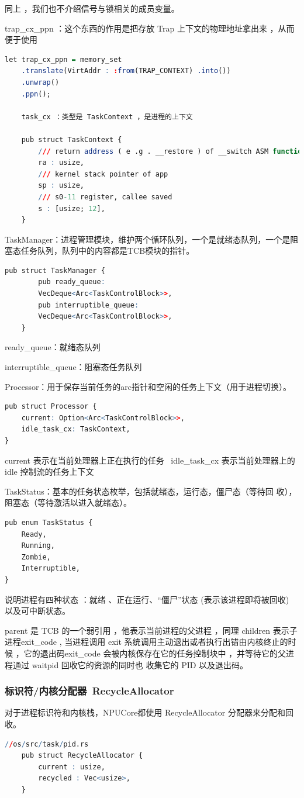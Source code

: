 同上 ，我们也不介绍信号与锁相关的成员变量。

trap\_cx\_ppn ：这个东西的作用是把存放 Trap 上下文的物理地址拿出来 ，从而便于使用

\begin{lstlisting}[language=R]
	let trap_cx_ppn = memory_set
	.translate(VirtAddr : :from(TRAP_CONTEXT) .into())
	.unwrap()
	.ppn();
	
	task_cx ：类型是 TaskContext ，是进程的上下文
	
	pub struct TaskContext {
		/// return address ( e .g . __restore ) of __switch ASM function
		ra : usize,
		/// kernel stack pointer of app
		sp : usize,
		/// s0-11 register, callee saved
		s : [usize; 12],
	}
\end{lstlisting}

TaskManager：进程管理模块，维护两个循环队列，一个是就绪态队列，一个是阻塞态任务队列，队列中的内容都是TCB模块的指针。
\begin{lstlisting}[language=R]
	pub struct TaskManager {
		pub ready_queue:
		VecDeque<Arc<TaskControlBlock>>,
		pub interruptible_queue:
		VecDeque<Arc<TaskControlBlock>>,
	}
\end{lstlisting}
ready\_queue：就绪态队列

interruptible\_queue：阻塞态任务队列

Processor：用于保存当前任务的arc指针和空闲的任务上下文（用于进程切换）。
\begin{lstlisting}[language=R]
	pub struct Processor {
	current: Option<Arc<TaskControlBlock>>,
	idle_task_cx: TaskContext,
}
\end{lstlisting}
current 表示在当前处理器上正在执行的任务
\
idle\_task\_cx 表示当前处理器上的 idle 控制流的任务上下文

TaskStatus：基本的任务状态枚举，包括就绪态，运行态，僵尸态（等待回
收），阻塞态（等待激活以进入就绪态）。
\begin{lstlisting}[language=R]
	pub enum TaskStatus {
	Ready,
	Running,
	Zombie,
	Interruptible,
}
\end{lstlisting}

说明进程有四种状态 ：就绪 、正在运行、“僵尸”状态  (表示该进程即将被回收)  以及可中断状态。

parent 是 TCB 的一个弱引用 ，他表示当前进程的父进程 ，同理 children 表示子进程exit\_code , 当进程调用  exit 系统调用主动退出或者执行出错由内核终止的时候 ，它的退出码exit\_code 会被内核保存在它的任务控制块中 ，并等待它的父进程通过  waitpid 回收它的资源的同时也 收集它的 PID 以及退出码。

\subsubsection{标识符/内核分配器\ RecycleAllocator}
对于进程标识符和内核栈，NPUCore都使用 RecycleAllocator 分配器来分配和回收。
\begin{lstlisting}[language=R]
	//os/src/task/pid.rs
	pub struct RecycleAllocator {
		current : usize,
		recycled : Vec<usize>,
	}
\end{lstlisting}

